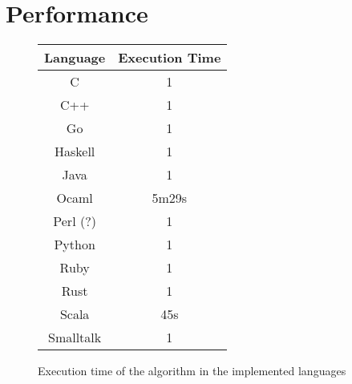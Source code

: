 \section{Performance}
\label{sec:Performance}
    \begin{figure}[!h]
    \centering
    \begin{tabular}{c|c}
    Language & Execution Time \\
    \hline
    C & 1 \\
    C++ & 1 \\
    Go & 1 \\
    Haskell & 1 \\
    Java & 1 \\
    Ocaml & 5m29s \\
    Perl (?) & 1 \\
    Python & 1 \\
    Ruby & 1 \\
    Rust & 1 \\
    Scala & 45s \\
    Smalltalk & 1 \\
    \hline
    \end{tabular}
    \caption{Execution time of the algorithm in the implemented languages}
    \label{fig:my_label}
    \end{figure}